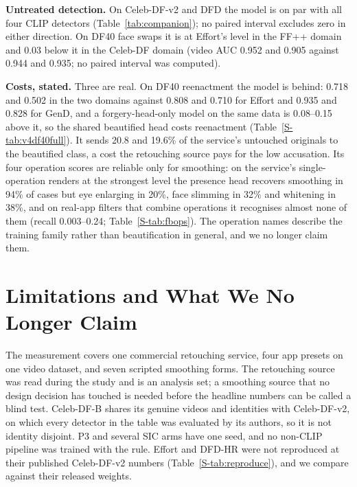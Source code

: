 \documentclass[conference]{IEEEtran}
\begin{document}
\textbf{Untreated detection.} On Celeb-DF-v2 and DFD the model is on par with all four CLIP detectors (Table~\ref{tab:companion});
no paired interval excludes zero in either direction. On DF40 face swaps it is at Effort's level in the FF++ domain and
0.03 below it in the Celeb-DF domain (video AUC 0.952 and 0.905 against 0.944 and 0.935; no paired interval was computed).

\textbf{Costs, stated.} Three are real. On DF40 reenactment the model is behind: 0.718 and 0.502 in the two domains against
0.808 and 0.710 for Effort and 0.935 and 0.828 for GenD, and a forgery-head-only model on the same data is 0.08--0.15 above
it, so the shared beautified head costs reenactment (Table~\ref{S-tab:v4df40full}).
It sends 20.8 and 19.6\% of the service's untouched originals to the beautified class,
a cost the retouching source pays for the low accusation. Its four operation scores are reliable only for smoothing: on the
service's single-operation renders at the strongest level the presence head recovers smoothing in 94\% of cases but eye
enlarging in 20\%, face slimming in 32\% and whitening in 38\%,
and on real-app filters that combine operations it recognises almost none of them (recall 0.003--0.24; Table~\ref{S-tab:fbops}).
The operation names describe the training family rather than beautification in general, and we no longer claim them.

\section{Limitations and What We No Longer Claim}
\label{sec:limits}
The measurement covers one commercial retouching service, four app presets on one video dataset, and seven scripted
smoothing forms. The retouching source was read during the study and is an analysis set; a smoothing source that no design
decision has touched is needed before the headline numbers can be called a blind test. Celeb-DF-B shares its genuine videos
and identities with Celeb-DF-v2, on which every detector in the table was evaluated by its authors, so it is not identity
disjoint. P3 and several SIC arms have one seed, and no non-CLIP pipeline was trained with the rule. Effort and DFD-HR were
not reproduced at their published Celeb-DF-v2 numbers (Table~\ref{S-tab:reproduce}), and we compare against their released
weights.
\end{document}
